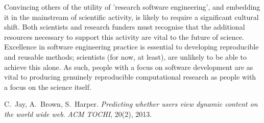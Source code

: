 \documentclass[a4paper,UKenglish]{dagrep}
\begin{document}
Convincing others of the utility of 'research software engineering', and embedding it 
in the mainstream of scientific activity, is likely to require a significant cultural shift. 
Both scientists and research funders must recognise that the additional resources 
necessary to support this activity are vital to the future of science. Excellence in 
software engineering practice is essential to developing reproducible and reusable 
methods; scientists (for now, at least), are unlikely to be able to achieve this alone. As 
such, people with a focus on software development are as vital to producing genuinely 
reproducible computational research as people with a focus on the science itself. 

\begin{thebibliography}{0}
 C.~Jay, A.~Brown, S.~Harper.
\textsl{Predicting whether users view dynamic content on the world wide web}.
{\em ACM TOCHI}, 20(2), 2013.
\end{thebibliography}
 
\end{document}
